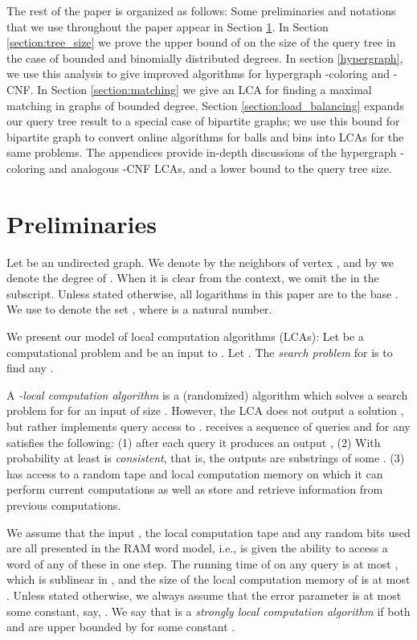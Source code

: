 \documentclass[english, oribibl]{llncs}
\begin{document}
The rest of the paper is organized as follows:
Some preliminaries and notations that we use throughout the paper appear in Section \ref{section:preliminaries}.
In Section \ref{section:tree_size} we prove the upper bound of  on 
the size of the query tree in the case of bounded and binomially distributed degrees.
In section \ref{hypergraph}, we use this analysis to give improved algorithms for hypergraph -coloring and -CNF.
In Section \ref{section:matching} we give an LCA for finding a maximal matching in graphs of bounded degree. 
Section \ref{section:load_balancing} expands our query tree result to a special case of bipartite graphs;
we use this bound for bipartite graph to convert online algorithms for balls and bins into LCAs for the same problems.
The appendices provide in-depth discussions of the hypergraph -coloring and analogous -CNF LCAs, and a lower bound to the query tree size.




\section{Preliminaries}\label{section:preliminaries}



Let  be an undirected graph.
We denote by  
the neighbors of vertex , and by  we denote the degree of .
When it is clear from the context, we omit the  in the subscript.
Unless stated otherwise, all logarithms in this paper are to the base .
We use  to denote the set , where  is a natural number. 


We present our model of local computation algorithms (LCAs):
Let  be a computational problem and  be an input to .
Let  .
The {\em search problem} for  is to find any .


A {\em -local computation algorithm} 
is a (randomized) algorithm which solves a search problem for  for an input  of size .
However, the LCA  does not output a solution , but rather
implements query access to .  receives a sequence of queries  and for any  satisfies the following:
(1) after each query  it produces an output ,
(2) With probability at least   is \emph{consistent}, that is, the outputs  are substrings of some .
(3)  has access to a random tape and local computation memory on which
it can perform current computations as well as store and retrieve information from previous computations.

We assume that the input , the local computation tape and any
random bits used are all presented in the RAM word model, i.e.,
 is given the ability to access a word of any of these in one step.
The running time of  on any query is at most , which is sublinear in ,
and the size of the local computation memory of  is at most .
Unless stated otherwise, we always assume that the error parameter
 is at most some constant, say, .
We say that   is a {\em strongly local computation algorithm}
if both  and  are upper bounded by  for some constant .
\end{document}
